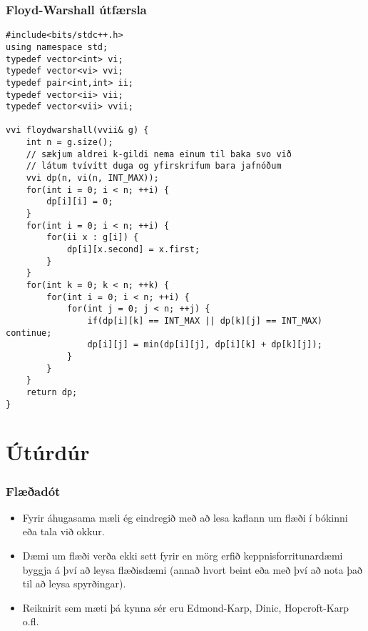 \documentclass{beamer}
\begin{document}
\begin{frame}[fragile]
\frametitle{Floyd-Warshall útfærsla}

\begin{tiny}
\begin{verbatim}
#include<bits/stdc++.h>
using namespace std;
typedef vector<int> vi;
typedef vector<vi> vvi;
typedef pair<int,int> ii;
typedef vector<ii> vii;
typedef vector<vii> vvii;

vvi floydwarshall(vvii& g) {
    int n = g.size();
    // sækjum aldrei k-gildi nema einum til baka svo við
    // látum tvívítt duga og yfirskrifum bara jafnóðum
    vvi dp(n, vi(n, INT_MAX));
    for(int i = 0; i < n; ++i) {
        dp[i][i] = 0;
    }
    for(int i = 0; i < n; ++i) {
        for(ii x : g[i]) {
            dp[i][x.second] = x.first;
        }
    }
    for(int k = 0; k < n; ++k) {
        for(int i = 0; i < n; ++i) {
            for(int j = 0; j < n; ++j) {
                if(dp[i][k] == INT_MAX || dp[k][j] == INT_MAX) continue;
                dp[i][j] = min(dp[i][j], dp[i][k] + dp[k][j]);
            }
        }
    }
    return dp;
}
\end{verbatim}
\end{tiny}

\end{frame}

\section[Útúrdúr]{Útúrdúr}

\begin{frame}
\frametitle{Flæðadót}

\begin{itemize}

\item<1-> Fyrir áhugasama mæli ég eindregið með að lesa kaflann um flæði í bókinni eða tala við okkur.

\item<2-> Dæmi um flæði verða ekki sett fyrir en mörg erfið keppnisforritunardæmi byggja á því að leysa flæðisdæmi (annað hvort beint eða með því að nota það til að leysa spyrðingar).

\item<3-> Reiknirit sem mæti þá kynna sér eru Edmond-Karp, Dinic, Hopcroft-Karp o.fl.

\end{itemize}

\end{frame}
\end{document}

